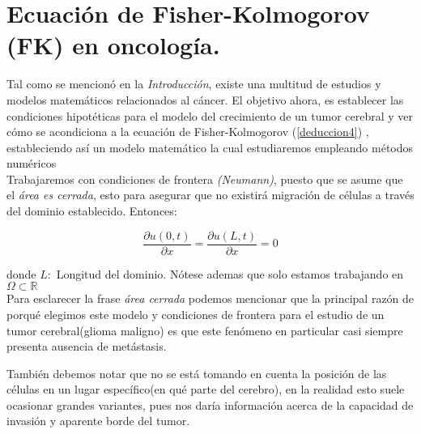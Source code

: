 \section{Ecuación de Fisher-Kolmogorov (FK) en oncología.}

Tal como se mencionó en la \textit{Introducción}, existe una multitud de estudios y modelos matemáticos relacionados al cáncer. El objetivo ahora, es establecer las condiciones hipotéticas para el modelo del crecimiento de un tumor cerebral y ver cómo se acondiciona a la ecuación de Fisher-Kolmogorov (\ref{deduccion4}) , estableciendo así un modelo matemático la cual estudiaremos empleando métodos numéricos\\

Trabajaremos con condiciones de frontera \textit{(Neumann)}, puesto que se asume que el \textit{área es cerrada}, esto para asegurar que no existirá migración de células a través del dominio establecido. Entonces:

\begin{equation}
	\label{oncologia1}
	\dfrac{\partial u(0,t)}{\partial x}=\dfrac{\partial u(L,t)}{\partial x}=0
\end{equation}

\vspace{0.5cm}
donde $L:$ Longitud del dominio. Nótese ademas que solo estamos trabajando en $ \Omega \subset \mathbb{R}$\\

Para esclarecer la frase \textit{área cerrada} podemos mencionar que la principal razón de porqué elegimos este modelo y condiciones de frontera para el estudio de un tumor cerebral(glioma maligno) es que este fenómeno en particular casi siempre presenta ausencia de metástasis.

\begin{obs}
\end{obs}

También debemos notar que no se está tomando en cuenta la posición de las células en un lugar específico(en qué parte del cerebro), en la realidad esto suele ocasionar grandes variantes, pues nos daría información acerca de la capacidad de invasión y aparente borde del tumor.\\

